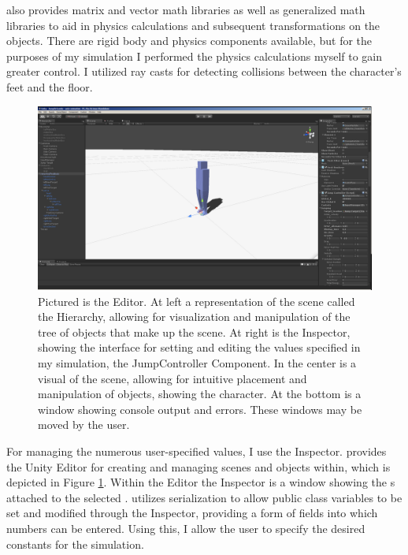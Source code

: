 	\unity{} also provides matrix and vector math libraries as well as generalized math libraries to aid in physics calculations and subsequent transformations on the objects.  There are rigid body and physics components available, but for the purposes of my simulation I performed the physics calculations myself to gain greater control.  I utilized \unity{} ray casts for detecting collisions between the character's feet and the floor.
	
	\begin{figure}[ht]
		\centering
		\includegraphics[width=\textwidth]{images/unityEditor.png}
		\caption[Screenshot of the \unity{} Editor]{Pictured is the \unity{} Editor.  At left a representation of the scene called the Hierarchy, allowing for visualization and manipulation of the tree of objects that make up the scene.  At right is the Inspector, showing the interface for setting and editing the values specified in my simulation, the JumpController Component.  In the center is a visual of the scene, allowing for intuitive placement and manipulation of objects, showing the character.  At the bottom is a window showing console output and errors.  These windows may be moved by the user.}
		\label{fig:unity_interface}
	\end{figure}	
	
	For managing the numerous user-specified values, I use the \unity{} Inspector.  \unity{} provides the Unity Editor for creating and managing scenes and objects within, which is depicted in Figure \ref{fig:unity_interface}.  Within the Editor the Inspector is a window showing the s attached to the selected .  \unity{} utilizes serialization to allow public class variables to be set and modified through the Inspector, providing a form of fields into which numbers can be entered.  Using this, I allow the user to specify the desired constants for the simulation.

